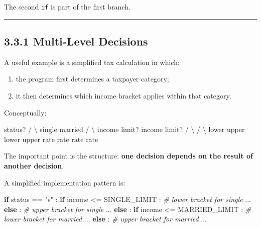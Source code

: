 \documentclass[
  11pt,
  a4paper,
]{article}
\newenvironment{Shaded}{}{}
\newcommand{\CommentTok}[1]{\textcolor[rgb]{0.38,0.63,0.69}{\textit{#1}}}
\newcommand{\ControlFlowTok}[1]{\textcolor[rgb]{0.00,0.44,0.13}{\textbf{#1}}}
\newcommand{\NormalTok}[1]{#1}
\newcommand{\OperatorTok}[1]{\textcolor[rgb]{0.40,0.40,0.40}{#1}}
\newcommand{\StringTok}[1]{\textcolor[rgb]{0.25,0.44,0.63}{#1}}
\providecommand{\tightlist}{%
  \setlength{\itemsep}{0pt}\setlength{\parskip}{0pt}}
\begin{document}
The second \texttt{if} is part of the first branch.

\begin{center}\rule{0.5\linewidth}{0.5pt}\end{center}

\subsection{3.3.1 Multi-Level Decisions}\label{multi-level-decisions}

A useful example is a simplified tax calculation in which:

\begin{enumerate}
\def\labelenumi{\arabic{enumi}.}
\tightlist
\item
  the program first determines a taxpayer category;
\item
  it then determines which income bracket applies within that category.
\end{enumerate}

Conceptually:

\begin{Shaded}
\begin{Highlighting}[]
\NormalTok{                     status?}
\NormalTok{                 /             \textbackslash{}}
\NormalTok{             single           married}
\NormalTok{              /                  \textbackslash{}}
\NormalTok{        income limit?        income limit?}
\NormalTok{          /      \textbackslash{}             /      \textbackslash{}}
\NormalTok{      lower     upper       lower     upper}
\NormalTok{      rate      rate        rate      rate}
\end{Highlighting}
\end{Shaded}

The important point is the structure: \textbf{one decision depends on
the result of another decision}.

A simplified implementation pattern is:

\begin{Shaded}
\begin{Highlighting}[]
\ControlFlowTok{if}\NormalTok{ status }\OperatorTok{==} \StringTok{"s"}\NormalTok{ :}
    \ControlFlowTok{if}\NormalTok{ income }\OperatorTok{\textless{}=}\NormalTok{ SINGLE\_LIMIT :}
        \CommentTok{\# lower bracket for single}
\NormalTok{        ...}
    \ControlFlowTok{else}\NormalTok{ :}
        \CommentTok{\# upper bracket for single}
\NormalTok{        ...}
\ControlFlowTok{else}\NormalTok{ :}
    \ControlFlowTok{if}\NormalTok{ income }\OperatorTok{\textless{}=}\NormalTok{ MARRIED\_LIMIT :}
        \CommentTok{\# lower bracket for married}
\NormalTok{        ...}
    \ControlFlowTok{else}\NormalTok{ :}
        \CommentTok{\# upper bracket for married}
\NormalTok{        ...}
\end{Highlighting}
\end{Shaded}
\end{document}
